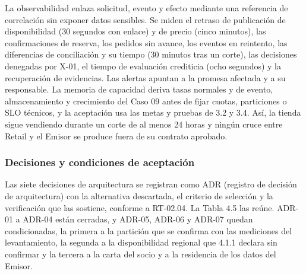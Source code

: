 \documentclass[11pt]{article}
\begin{document}
La observabilidad enlaza solicitud, evento y efecto mediante una referencia de correlación sin exponer datos sensibles. Se miden el retraso de publicación de disponibilidad (30 segundos con enlace) y de precio (cinco minutos), las confirmaciones de reserva, los pedidos sin avance, los eventos en reintento, las diferencias de conciliación y su tiempo (30 minutos tras un corte), las decisiones denegadas por X-01, el tiempo de evaluación crediticia (ocho segundos) y la recuperación de evidencias. Las alertas apuntan a la promesa afectada y a su responsable. La memoria de capacidad deriva tasas normales y de evento, almacenamiento y crecimiento del Caso 09 antes de fijar cuotas, particiones o SLO técnicos, y la aceptación usa las metas y pruebas de 3.2 y 3.4. Así, la tienda sigue vendiendo durante un corte de al menos 24 horas y ningún cruce entre Retail y el Emisor se produce fuera de su contrato aprobado.

\subsubsection{Decisiones y condiciones de aceptación}

Las siete decisiones de arquitectura se registran como ADR (registro de decisión de arquitectura) con la alternativa descartada, el criterio de selección y la verificación que las sostiene, conforme a RT-02.04. La Tabla 4.5 las reúne. ADR-01 a ADR-04 están cerradas, y ADR-05, ADR-06 y ADR-07 quedan condicionadas, la primera a la partición que se confirma con las mediciones del levantamiento, la segunda a la disponibilidad regional que 4.1.1 declara sin confirmar y la tercera a la carta del socio y a la residencia de los datos del Emisor.

\par\vspace{0pt plus 10\baselineskip}\vspace{0pt plus -10\baselineskip}
\end{document}
